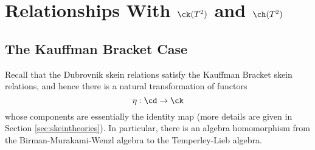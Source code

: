 \section{Relationships With $\ck(T^2)$ and $\ch(T^2)$} \label{sec:compatibility}

\subsection{The Kauffman Bracket Case} \label{sec:bracketcompatibility}

Recall that the Dubrovnik skein relations satisfy the Kauffman Bracket skein relations, and hence there is a natural transformation of functors
\[
\eta: \cd \to \ck
\]
whose components are essentially the identity map (more details are given in Section \ref{sec:skeintheories}). In particular, there is an algebra homomorphism from the Birman-Murakami-Wenzl algebra to the Temperley-Lieb algebra.

